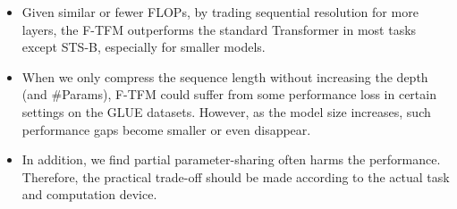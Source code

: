 \documentclass{article}
\theoremstyle{custom}
\begin{document}
\begin{itemize}[leftmargin=*,itemsep=0em,parsep=0em,topsep=0em]
\item Given similar or fewer FLOPs, by trading sequential resolution for more layers, the F-TFM outperforms the standard Transformer in most tasks except STS-B, especially for smaller models.
\item When we only compress the sequence length without increasing the depth (and \#Params), F-TFM could suffer from some performance loss in certain settings on the GLUE datasets.
However, as the model size increases, such performance gaps become smaller or even disappear.
\item In addition, we find partial parameter-sharing often harms the performance.
Therefore, the practical trade-off should be made according to the actual task and computation device.
\end{itemize}
\end{document}
